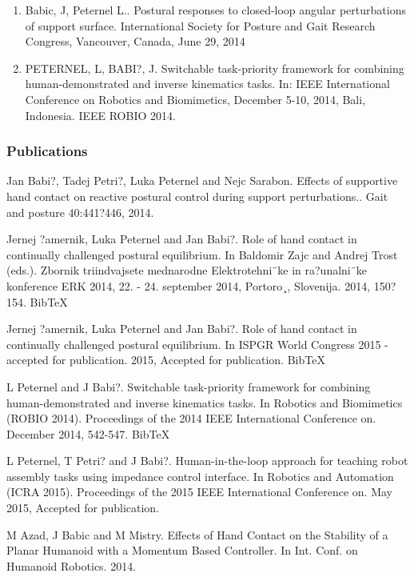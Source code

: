 \begin{enumerate}

\item Babic, J, Peternel L.. Postural responses to closed-loop angular perturbations of support surface. International Society for Posture and Gait Research Congress, Vancouver, Canada,  June 29, 2014

\item PETERNEL, L, BABI?, J. Switchable task-priority framework for combining human-demonstrated and inverse kinematics tasks. In: IEEE International Conference on Robotics and Biomimetics, December 5-10, 2014, Bali, Indonesia. IEEE ROBIO 2014.

\end{enumerate}

\subsubsection{Publications}

Jan Babi?, Tadej Petri?, Luka Peternel and Nejc Sarabon. Effects of supportive hand contact on reactive postural control during support perturbations.. Gait and posture 40:441?446, 2014.

Jernej ?amernik, Luka Peternel and Jan Babi?. Role of hand contact in continually challenged postural equilibrium. In Baldomir Zajc and Andrej Trost (eds.). Zbornik triindvajsete mednarodne Elektrotehni¨ke in ra?unalni¨ke konference ERK 2014, 22. - 24. september 2014, Portoro¸, Slovenija. 2014, 150?154. BibTeX

Jernej ?amernik, Luka Peternel and Jan Babi?. Role of hand contact in continually challenged postural equilibrium. In ISPGR World Congress 2015 - accepted for publication. 2015, Accepted for publication. BibTeX

L Peternel and J Babi?. Switchable task-priority framework for combining human-demonstrated and inverse kinematics tasks. In Robotics and Biomimetics (ROBIO 2014). Proceedings of the 2014 IEEE International Conference on. December 2014, 542-547. BibTeX

L Peternel, T Petri? and J Babi?. Human-in-the-loop approach for teaching robot assembly tasks using impedance control interface. In Robotics and Automation (ICRA 2015). Proceedings of the 2015 IEEE International Conference on. May 2015, Accepted for publication. 

M Azad, J Babic and M Mistry. Effects of Hand Contact on the Stability of a Planar Humanoid with a Momentum Based Controller. In Int. Conf. on Humanoid Robotics. 2014.

